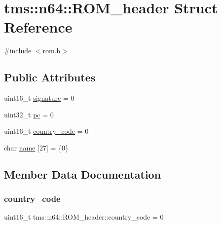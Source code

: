 \hypertarget{structtms_1_1n64_1_1_r_o_m__header}{}\section{tms\+:\+:n64\+:\+:R\+O\+M\+\_\+header Struct Reference}
\label{structtms_1_1n64_1_1_r_o_m__header}


{\ttfamily \#include $<$rom.\+h$>$}

\subsection*{Public Attributes}
\begin{DoxyCompactItemize}
\item 
uint16\+\_\+t \hyperlink{structtms_1_1n64_1_1_r_o_m__header_a0f23a48f9eb9a2dd53c1e2dd296791c2}{signature} = 0
\item 
uint32\+\_\+t \hyperlink{structtms_1_1n64_1_1_r_o_m__header_ad5756a9ec7e771f435223081030b992d}{pc} = 0
\item 
uint16\+\_\+t \hyperlink{structtms_1_1n64_1_1_r_o_m__header_a5814c5d80405e108669cc674a25a3890}{country\+\_\+code} = 0
\item 
char \hyperlink{structtms_1_1n64_1_1_r_o_m__header_a0b82a51350db776f74373189f027777a}{name} \mbox{[}27\mbox{]} = \{0\}
\end{DoxyCompactItemize}


\subsection{Member Data Documentation}
\mbox{\label{structtms_1_1n64_1_1_r_o_m__header_a5814c5d80405e108669cc674a25a3890}} 
\subsubsection{\texorpdfstring{country\+\_\+code}{country\_code}}
{\footnotesize\ttfamily uint16\+\_\+t tms\+::n64\+::\+R\+O\+M\+\_\+header\+::country\+\_\+code = 0}

\mbox{\label{structtms_1_1n64_1_1_r_o_m__header_a0b82a51350db776f74373189f027777a}} 
